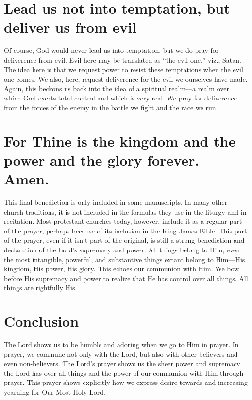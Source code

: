 \documentclass[12pt]{article}
\begin{document}
\section{Lead us not into temptation, but deliver us from evil}

Of course, God would never lead us into temptation, but we do pray for deliverence from evil.  Evil here may be translated as ``the evil one,'' viz., Satan.  The idea here is that we request power to resist these temptations when the evil one comes.  We also, here, request deliverence for the evil we ourselves have made.  Again, this beckons us back into the idea of a spiritual realm---a realm over which God exerts total control and which is very real.  We pray for deliverence from the forces of the enemy in the battle we fight and the race we run.

\section{For Thine is the kingdom and the power and the glory forever.  Amen.}

This final benediction is only included in some manuscripts.  In many other church traditions, it is not included in the formulas they use in the liturgy and in recitation.  Most protestant churches today, however, include it as a regular part of the prayer, perhaps because of its inclusion in the King James Bible.  This part of the prayer, even if it isn't part of the original, is still a strong benediction and declaration of the Lord's supremacy and power.  All things belong to Him, even the most intangible, powerful, and substantive things extant belong to Him---His kingdom, His power, His glory.  This echoes our communion with Him.  We bow before His supremacy and power to realize that He has control over all things.  All things are rightfully His.

\section{Conclusion}

The Lord shows us to be humble and adoring when we go to Him in prayer.  In prayer, we commune not only with the Lord, but also with other believers and even non-believers.  The Lord's prayer shows us the sheer power and supremacy the Lord has over all things and the power of our communion with Him through prayer. This prayer shows explicitly how we express desire towards and increasing yearning for Our Most Holy Lord.
\end{document}
